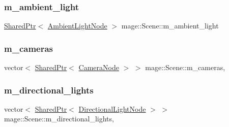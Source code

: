 \subsubsection{\texorpdfstring{m\+\_\+ambient\+\_\+light}{m\_ambient\_light}}
{\footnotesize\ttfamily \hyperlink{namespacemage_a1e01ae66713838a7a67d30e44c67703e}{Shared\+Ptr}$<$ \hyperlink{namespacemage_ab0783a7428706251f8561dc30a4d228d}{Ambient\+Light\+Node} $>$ mage\+::\+Scene\+::m\+\_\+ambient\+\_\+light\hspace{0.3cm}{\ttfamily [private]}}

\hypertarget{classmage_1_1_scene_a76fc089ae3185c82702d2ca42fd820e7}{}\label{classmage_1_1_scene_a76fc089ae3185c82702d2ca42fd820e7} 
\subsubsection{\texorpdfstring{m\+\_\+cameras}{m\_cameras}}
{\footnotesize\ttfamily vector$<$ \hyperlink{namespacemage_a1e01ae66713838a7a67d30e44c67703e}{Shared\+Ptr}$<$ \hyperlink{classmage_1_1_camera_node}{Camera\+Node} $>$ $>$ mage\+::\+Scene\+::m\+\_\+cameras\hspace{0.3cm}{\ttfamily [mutable]}, {\ttfamily [private]}}

\hypertarget{classmage_1_1_scene_a895f2ae809c17be09072f6bb89fd4e9c}{}\label{classmage_1_1_scene_a895f2ae809c17be09072f6bb89fd4e9c} 
\subsubsection{\texorpdfstring{m\+\_\+directional\+\_\+lights}{m\_directional\_lights}}
{\footnotesize\ttfamily vector$<$ \hyperlink{namespacemage_a1e01ae66713838a7a67d30e44c67703e}{Shared\+Ptr}$<$ \hyperlink{namespacemage_a7637b5351fc0f66a10badd80ebb35899}{Directional\+Light\+Node} $>$ $>$ mage\+::\+Scene\+::m\+\_\+directional\+\_\+lights\hspace{0.3cm}{\ttfamily [mutable]}, {\ttfamily [private]}}

\hypertarget{classmage_1_1_scene_a01132a667fbc1517f11ae561bc221071}{}\label{classmage_1_1_scene_a01132a667fbc1517f11ae561bc221071} 
